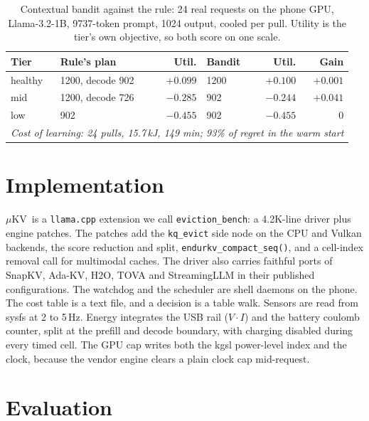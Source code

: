 \documentclass[sigconf, anonymous=false, screen=true]{acmart}
\newcommand{\ub}{\_\allowbreak}
\newcommand{\good}[1]{\textcolor{kvgreen}{\textbf{#1}}}
\newcommand{\muKV}{$\mu$KV}
\begin{document}
\begin{table}[tb]
\caption{Contextual bandit against the rule: 24 real requests on the phone GPU, Llama-3.2-1B, 9737-token prompt, 1024 output, cooled per pull. Utility is the tier's own objective, so both score on one scale.}
\label{tab:bandit}
\centering\footnotesize
\setlength{\tabcolsep}{3.5pt}
\begin{tabular}{l l r l r r}
\toprule
\textbf{Tier} & \textbf{Rule's plan} & \textbf{Util.} & \textbf{Bandit} & \textbf{Util.} & \textbf{Gain} \\
\midrule
healthy & 1200, decode 902 & $+0.099$ & 1200 & $+0.100$ & $+0.001$ \\
mid     & 1200, decode 726 & $-0.285$ & 902  & \good{$-0.244$} & \good{$+0.041$} \\
low     & 902              & $-0.455$ & 902  & $-0.455$ & $0$ \\
\midrule
\multicolumn{6}{l}{\emph{Cost of learning: 24 pulls, 15.7\,kJ, 149 min; 93\% of regret in the warm start}} \\
\bottomrule
\end{tabular}
\end{table}

\section{Implementation}
\label{sec:impl}

\muKV\ is a \texttt{llama.cpp} extension we call \texttt{eviction\ub bench}: a 4.2K-line driver plus engine patches. The patches add the \texttt{kq\_evict} side node on the CPU and Vulkan backends, the score reduction and split, \texttt{endurkv\_compact\_seq()}, and a cell-index removal call for multimodal caches. The driver also carries faithful ports of SnapKV, Ada-KV, H2O, TOVA and StreamingLLM in their published configurations. The watchdog and the scheduler are shell daemons on the phone. The cost table is a text file, and a decision is a table walk. Sensors are read from sysfs at 2 to 5\,Hz. Energy integrates the USB rail ($V{\cdot}I$) and the battery coulomb counter, split at the prefill and decode boundary, with charging disabled during every timed cell. The GPU cap writes both the kgsl power-level index and the clock, because the vendor engine clears a plain clock cap mid-request.

\section{Evaluation}
\label{sec:eval}
\end{document}
